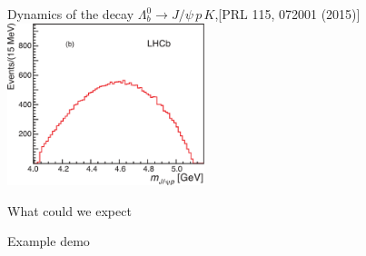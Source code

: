 \documentclass[aspectratio=169]{beamer}
\begin{document}
\begin{frame}{Dynamics of the decay $\Lambda_b^0\to J/\psi\,p\,K$,\hfill \scriptsize[PRL 115, 072001 (2015)]}{}
{\includegraphics[width=0.43\textwidth]{figs/PcOld/mjpsip-phsp_phase_space.pdf}}
\end{frame}

\begin{frame}{What could we expect}
    \begin{center}
        \Huge Example demo\\[1cm]
        \qquad
    \end{center}
\end{frame}
\end{document}
